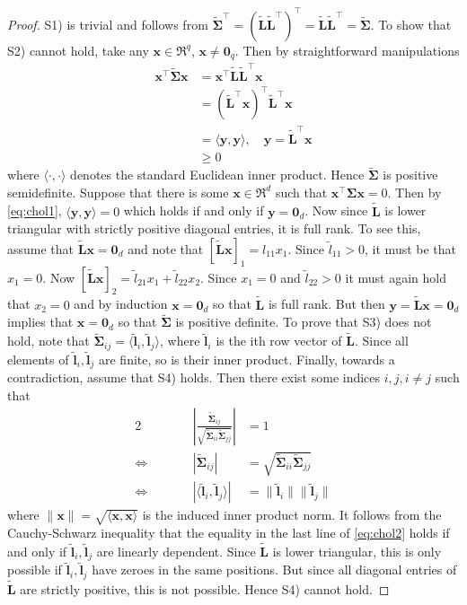 \documentclass[11pt, a4paper]{article}
\newcommand*{\bb}{\boldsymbol}
\theoremstyle{example} \newtheorem{example}{Example}[section]
\theoremstyle{theorem} \newtheorem{theorem}{Theorem}[section]
\theoremstyle{theorem }\newtheorem{proposition}{Proposition}[section]
\theoremstyle{theorem }\newtheorem{corollary}{Corollary}[section]
\def\\bbeta{\bb{\\bbeta}}
\begin{document}
\begin{proof}
	S1) is trivial and follows from $\tilde{\bb \Sigma}^\top =  (\tilde{\bb L}\tilde{\bb L}^\top)^\top = \tilde{\bb L}\tilde{\bb L}^\top = \tilde{\bb \Sigma}$.
	To show that S2) cannot hold, take any $\bb x\in \Re^q$, $\bb x\neq \bb 0_q$. Then by straightforward manipulations 
	\begin{equation}
	\label{eq:chol1}
	\begin{aligned}
	\bb x^\top\tilde{\bb \Sigma}\bb x &= \bb x^\top\tilde{\bb L}\tilde{\bb L}^\top\bb x\\ 
	&= (\tilde{\bb L}^\top\bb x)^\top\tilde{\bb L}^\top\bb x \\ 
	&= \langle \bb y,\bb y\rangle, \quad \bb y=\tilde{\bb L}^\top\bb x\\
	&\geq 0
	\end{aligned}
	\end{equation}
	where $\langle\cdot,\cdot\rangle$ denotes the standard Euclidean inner product. Hence $\tilde{\bb \Sigma}$ is positive semidefinite. Suppose that there is some $\bb x \in \Re^d$ such that $\bb x^\top \bb \Sigma \bb x=0$. Then by \eqref{eq:chol1}, $\langle \bb y,\bb y \rangle = 0$ which holds if and only if $\bb y=\bb 0_d$. Now since $\tilde{\bb L}$ is lower triangular with strictly positive diagonal entries, it is full rank. To see this, assume that $\tilde{\bb L}\bb x=\bb 0_d$ and note that $[\tilde{\bb L}\bb x]_1 = l_{11}x_1$. Since $\tilde{l}_{11}>0$, it must be that $x_1=0$. Now $[\tilde{\bb L}\bb x]_2 = \tilde{l}_{21}x_1+\tilde{l}_{22}x_2$. Since $x_1=0$ and $\tilde{l}_{22}>0$ it must again hold that $x_2=0$ and by induction $\bb x=\bb 0_d$ so that $\tilde{\bb L}$ is full rank. But then $\bb y = \tilde{\bb L}\bb x=\bb 0_d$ implies that $\bb x = \bb 0_d$ so that $\tilde{\bb \Sigma}$ is positive definite. 
	To prove that S3) does not hold, note that $\tilde{\bb \Sigma}_{ij} = \langle \tilde{\bb l}_i,\tilde{\bb l}_j \rangle$, where $\tilde{\bb l}_i$ is the ith row vector of $\tilde{\bb L}$. Since all elements of $\tilde{\bb l}_i,\tilde{\bb l}_j$ are finite, so is their inner product.  
	Finally, towards a contradiction, assume that S4) holds. Then there exist some indices $i,j, i \neq j$ such that 
	\begin{alignat}{2}\label{eq:chol2}
	&\qquad& 
	\left|\frac{\tilde{\bb \Sigma}_{ij} }{\sqrt{ \tilde{\bb \Sigma}_{ii} \tilde{\bb \Sigma}_{jj}}}\right|&=1 \\ 
	\iff&& |\tilde{\bb \Sigma}_{ij}| &= \sqrt{ \tilde{\bb \Sigma}_{ii} \tilde{\bb \Sigma}_{jj}} \\ 
	\iff && |\langle \tilde{\bb l}_i,\tilde{\bb l}_j\rangle| &= \|\tilde{\bb l}_i\|\|\tilde{\bb l}_j\|
	\end{alignat}
	where $\|\bb x\|= \sqrt{\langle\bb x ,\bb x\rangle}$ is the induced inner product norm. It follows from the Cauchy-Schwarz inequality that the equality in the last line of \eqref{eq:chol2} holds if and only if $\tilde{\bb l}_i,\tilde{\bb l}_j$ are linearly dependent. Since $\tilde{\bb L}$ is lower triangular, this is only possible if $\tilde{\bb l}_i,\tilde{\bb l}_j$ have zeroes in the same positions. But since all diagonal entries of $\tilde{\bb L}$ are strictly positive, this is not possible. Hence S4) cannot hold. 
\end{proof}
\end{document}
